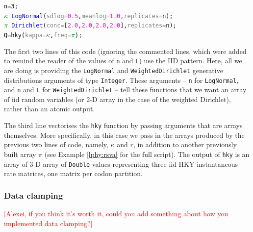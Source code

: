 \documentclass[10pt,letterpaper,table]{article}
\begin{document}
{\singlespacing
\begin{alltt}
  n = 3;
  \textcolor{green}{\(\kappa\)} ~ \textcolor{blue}{LogNormal}(\textcolor{gray}{sdlog=}\textcolor{magenta}{0.5}, \textcolor{gray}{meanlog=}\textcolor{magenta}{1.0}, \textcolor{gray}{replicates=}n);
  \textcolor{green}{\(\pi\)} ~ \textcolor{blue}{Dirichlet}(\textcolor{gray}{conc=}[\textcolor{magenta}{2.0}, \textcolor{magenta}{2.0}, \textcolor{magenta}{2.0}, \textcolor{magenta}{2.0}], \textcolor{gray}{replicates=}n);
  \textcolor{black}{Q = }\textcolor{magenta!80!black}{hky}(\textcolor{gray}{kappa=}\textcolor{green}{\(\kappa\)}, \textcolor{gray}{freq=}\textcolor{green}{\(\pi\)});

\end{alltt} 

The first two lines of this code (ignoring the commented lines, which
were added to remind the reader of the values of \texttt{n} and
\texttt{L}) use the IID pattern.
Here, all we are doing is providing the \texttt{LogNormal} and
\texttt{WeightedDirichlet} generative distributions arguments of
type \texttt{Integer}.
These arguments -- \texttt{n} for \texttt{LogNormal}, and \texttt{n}
and \texttt{L} for \texttt{WeightedDirichlet} -- tell these functions
that we want an array of iid random variables (or 2-D array in the
case of the weighted Dirichlet), rather than an atomic output. 

The third line vectorises the \texttt{hky} function by passing
arguments that are arrays themselves.
More specifically, in this case we pass in the arrays produced by the
previous two lines of code, namely, \texttt{$\kappa$} and
\texttt{$r$}, in addition to another previously built array
\texttt{$\pi$} (see Example \ref{lphy:rsva} for the full script).
The output of \texttt{hky} is an array of 3-D array of \texttt{Double}
values representing three iid HKY \cite{hky} instantaneous rate
matrices, one matrix per codon partition.

\subsubsection*{Data clamping}

\textcolor{red}{[Alexei, if you think it's worth it, could you add
  something about how you implemented data clamping?]}


}
\end{document}
